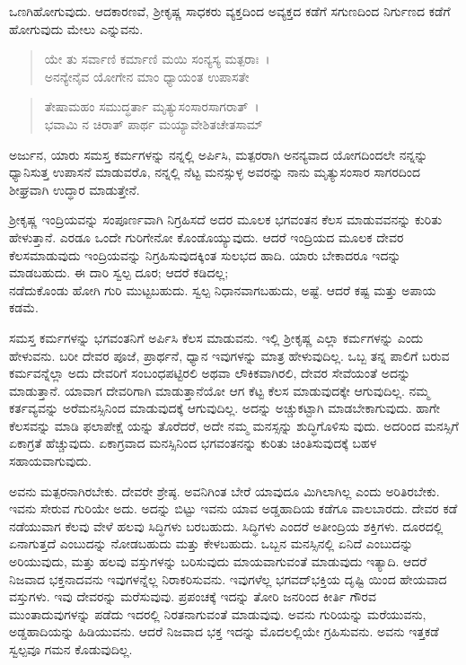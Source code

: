 ಒಣಗಿಹೋಗುವುದು. ಆದಕಾರಣವೆ, ಶ‍್ರೀಕೃಷ್ಣ ಸಾಧಕರು ವ್ಯಕ್ತದಿಂದ ಅವ್ಯಕ್ತದ ಕಡೆಗೆ ಸಗುಣದಿಂದ ನಿರ್ಗುಣದ ಕಡೆಗೆ ಹೋಗುವುದು ಮೇಲು ಎನ್ನುವನು.

\begin{verse}
ಯೇ ತು ಸರ್ವಾಣಿ ಕರ್ಮಾಣಿ ಮಯಿ ಸಂನ್ಯಸ್ಯ ಮತ್ಪರಾಃ~।\\ಅನನ್ಯೇನೈವ ಯೋಗೇನ ಮಾಂ ಧ್ಯಾಯಂತ ಉಪಾಸತೇ 
\end{verse}

\begin{verse}
ತೇಷಾಮಹಂ ಸಮುದ್ಧರ್ತಾ ಮೃತ್ಯುಸಂಸಾರಸಾಗರಾತ್~।\\ಭವಾಮಿ ನ ಚಿರಾತ್ ಪಾರ್ಥ ಮಯ್ಯಾವೇಶಿತಚೇತಸಾಮ್ 
\end{verse}

{\small ಅರ್ಜುನ, ಯಾರು ಸಮಸ್ತ ಕರ್ಮಗಳನ್ನು ನನ್ನಲ್ಲಿ ಅರ್ಪಿಸಿ, ಮತ್ಪರರಾಗಿ ಅನನ್ಯವಾದ ಯೋಗದಿಂದಲೇ ನನ್ನನ್ನು ಧ್ಯಾನಿಸುತ್ತ ಉಪಾಸನೆ ಮಾಡುವರೊ, ನನ್ನಲ್ಲಿ ನೆಟ್ಟ ಮನಸ್ಸುಳ್ಳ ಅವರನ್ನು ನಾನು ಮೃತ್ಯುಸಂಸಾರ ಸಾಗರದಿಂದ ಶೀಘ್ರವಾಗಿ ಉದ್ಧಾರ ಮಾಡುತ್ತೇನೆ.}

ಶ‍್ರೀಕೃಷ್ಣ ಇಂದ್ರಿಯವನ್ನು ಸಂಪೂರ್ಣವಾಗಿ ನಿಗ್ರಹಿಸದೆ ಅದರ ಮೂಲಕ ಭಗವಂತನ ಕೆಲಸ ಮಾಡುವವನನ್ನು ಕುರಿತು ಹೇಳುತ್ತಾನೆ. ಎರಡೂ ಒಂದೇ ಗುರಿಗೇನೋ ಕೊಂಡೊಯ್ಯುವುದು. ಆದರೆ ಇಂದ್ರಿಯದ ಮೂಲಕ ದೇವರ ಕೆಲಸಮಾಡುವುದು ಇಂದ್ರಿಯವನ್ನು ನಿಗ್ರಹಿಸುವುದಕ್ಕಿಂತ ಸುಲಭದ ಹಾದಿ. ಯಾರು ಬೇಕಾದರೂ ಇದನ್ನು ಮಾಡಬಹುದು. ಈ ದಾರಿ ಸ್ವಲ್ಪ ದೂರ; ಆದರೆ ಕಡಿದಲ್ಲ;\\ನಡೆದುಕೊಂಡು ಹೋಗಿ ಗುರಿ ಮುಟ್ಟಬಹುದು. ಸ್ವಲ್ಪ ನಿಧಾನವಾಗಬಹುದು, ಅಷ್ಟೆ. ಆದರೆ ಕಷ್ಟ ಮತ್ತು ಅಪಾಯ ಕಡಮೆ.

ಸಮಸ್ತ ಕರ್ಮಗಳನ್ನು ಭಗವಂತನಿಗೆ ಅರ್ಪಿಸಿ ಕೆಲಸ ಮಾಡುವನು. ಇಲ್ಲಿ ಶ‍್ರೀಕೃಷ್ಣ ಎಲ್ಲಾ ಕರ್ಮಗಳನ್ನು ಎಂದು ಹೇಳುವನು. ಬರೀ ದೇವರ ಪೂಜೆ, ಪ್ರಾರ್ಥನೆ, ಧ್ಯಾನ ಇವುಗಳನ್ನು ಮಾತ್ರ ಹೇಳುವುದಿಲ್ಲ. ಒಬ್ಬ ತನ್ನ ಪಾಲಿಗೆ ಬರುವ ಕರ್ಮವನ್ನೆಲ್ಲಾ ಅದು ದೇವರಿಗೆ ಸಂಬಂಧಪಟ್ಟಿರಲಿ ಅಥವಾ ಲೌಕಿಕವಾಗಿರಲಿ, ದೇವರ ಸೇವೆಯಂತೆ ಅದನ್ನು ಮಾಡುತ್ತಾನೆ. ಯಾವಾಗ ದೇವರಿಗಾಗಿ ಮಾಡುತ್ತಾನೆಯೋ ಆಗ ಕೆಟ್ಟ ಕೆಲಸ ಮಾಡುವುದಕ್ಕೇ ಆಗುವುದಿಲ್ಲ. ನಮ್ಮ ಕರ್ತವ್ಯವನ್ನು ಅರೆಮನಸ್ಸಿನಿಂದ ಮಾಡುವುದಕ್ಕೆ ಆಗುವುದಿಲ್ಲ. ಅದನ್ನು ಅಚ್ಚುಕಟ್ಟಾಗಿ ಮಾಡಬೇಕಾಗುವುದು. ಹಾಗೇ ಕೆಲಸವನ್ನು ಮಾಡಿ ಫಲಾಪೇಕ್ಷೆ ಯನ್ನು ತೊರೆದರೆ, ಅದೇ ನಮ್ಮ ಮನಸ್ಸನ್ನು ಶುದ್ಧಿಗೊಳಿಸು ವುದು. ಅದರಿಂದ ಮನಸ್ಸಿಗೆ ಏಕಾಗ್ರತೆ ಹೆಚ್ಚುವುದು. ಏಕಾಗ್ರವಾದ ಮನಸ್ಸಿನಿಂದ ಭಗವಂತನನ್ನು ಕುರಿತು ಚಿಂತಿಸುವುದಕ್ಕೆ ಬಹಳ ಸಹಾಯವಾಗುವುದು.

ಅವನು ಮತ್ಪರನಾಗಿರಬೇಕು. ದೇವರೇ ಶ್ರೇಷ್ಠ. ಅವನಿಗಿಂತ ಬೇರೆ ಯಾವುದೂ ಮಿಗಿಲಾಗಿಲ್ಲ ಎಂದು ಅರಿತಿರಬೇಕು. ಇವನು ಸೇರುವ ಗುರಿಯೇ ಅದು. ಅದನ್ನು ಬಿಟ್ಟು ಇವನು ಯಾವ ಅಡ್ಡಹಾದಿಯ ಕಡೆಗೂ ವಾಲಬಾರದು. ದೇವರ ಕಡೆ ನಡೆಯುವಾಗ ಕೆಲವು ವೇಳೆ ಹಲವು ಸಿದ್ಧಿಗಳು ಬರಬಹುದು. ಸಿದ್ಧಿಗಳು ಎಂದರೆ ಅತೀಂದ್ರಿಯ ಶಕ್ತಿಗಳು. ದೂರದಲ್ಲಿ ಏನಾಗುತ್ತದೆ ಎಂಬುದನ್ನು ನೋಡಬಹುದು ಮತ್ತು ಕೇಳಬಹುದು. ಒಬ್ಬನ ಮನಸ್ಸಿನಲ್ಲಿ ಏನಿದೆ ಎಂಬುದನ್ನು ಅರಿಯುವುದು, ಮತ್ತು ಹಲವು ವಸ್ತುಗಳನ್ನು ಬರಿಸುವುದು ಮಾಯವಾಗುವಂತೆ ಮಾಡುವುದು ಇತ್ಯಾದಿ. ಆದರೆ ನಿಜವಾದ ಭಕ್ತನಾದವನು ಇವುಗಳನ್ನೆಲ್ಲ ನಿರಾಕರಿಸುವನು. ಇವುಗಳೆಲ್ಲ ಭಗವದ್​ಭಕ್ತಿಯ ದೃಷ್ಟಿ ಯಿಂದ ಹೇಯವಾದ ವಸ್ತುಗಳು. ಇವು ದೇವರನ್ನು ಮರೆಸುವುವು. ಪ್ರಪಂಚಕ್ಕೆ ಇದನ್ನು ತೋರಿ ಜನರಿಂದ ಕೀರ್ತಿ ಗೌರವ ಮುಂತಾದುವುಗಳನ್ನು ಪಡೆದು ಇದರಲ್ಲಿ ನಿರತನಾಗುವಂತೆ ಮಾಡುವುವು. ಅವನು ಗುರಿಯನ್ನು ಮರೆಯುವನು, ಅಡ್ಡಹಾದಿಯನ್ನು ಹಿಡಿಯುವನು. ಆದರೆ ನಿಜವಾದ ಭಕ್ತ ಇದನ್ನು ಮೊದಲಲ್ಲಿಯೇ ಗ್ರಹಿಸುವನು. ಅವನು ಇತ್ತಕಡೆ ಸ್ವಲ್ಪವೂ ಗಮನ ಕೊಡುವುದಿಲ್ಲ.


